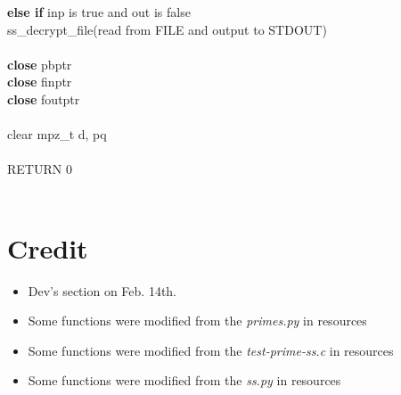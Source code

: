 \documentclass[12pt]{article}
\begin{document}
\indent \textbf{else if} inp is true and out is false \\
\indent\indent ss\_decrypt\_file(read from FILE and output to STDOUT) \\
\\
\indent \textbf{close} pbptr \\
\indent \textbf{close} finptr \\
\indent \textbf{close} foutptr \\
\\
\indent clear mpz\_t d, pq \\
\\
\indent RETURN 0 \\
\\
\section{Credit}

\begin{itemize}
  \item Dev's section on Feb. 14th.
  \item Some functions were modified from the \textit{primes.py} in resources
  \item Some functions were modified from the \textit{test-prime-ss.c} in resources
  \item Some functions were modified from the \textit{ss.py} in resources
\end{itemize}
\end{document}
